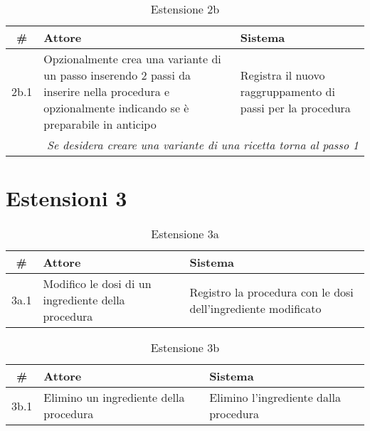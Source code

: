 \begin{table}[H]\centering\caption*{Estensione 2b}
      \small
      \begin{tabular}{|c|p{7cm}|p{6.24cm}|}
            \hline\bfseries \# & \bfseries Attore                                                                                                                                 & \bfseries Sistema                                          \\\hline
            2b.1               & Opzionalmente crea una variante di un passo inserendo 2 passi da inserire nella procedura e opzionalmente indicando se è preparabile in anticipo & Registra il nuovo raggruppamento di passi per la procedura \\\hline
            \multicolumn{3}{|r|}{\textit{Se desidera creare una variante di una ricetta torna al passo 1}}                                                                                                                                     \\\hline
      \end{tabular}
\end{table}

\section*{Estensioni 3}
\begin{table}[H]\centering\caption*{Estensione 3a}
      \small
      \begin{tabular}{|c|p{7cm}|p{6.24cm}|}
            \hline\bfseries \# & \bfseries Attore                                   & \bfseries Sistema                                             \\\hline
            3a.1               & Modifico le dosi di un ingrediente della procedura & Registro la procedura con le dosi dell’ingrediente modificato \\\hline
      \end{tabular}
\end{table}

\begin{table}[H]\centering\caption*{Estensione 3b}
      \small
      \begin{tabular}{|c|p{7cm}|p{6.24cm}|}
            \hline\bfseries \# & \bfseries Attore                       & \bfseries Sistema                     \\\hline
            3b.1               & Elimino un ingrediente della procedura & Elimino l’ingrediente dalla procedura \\\hline
      \end{tabular}
\end{table}

